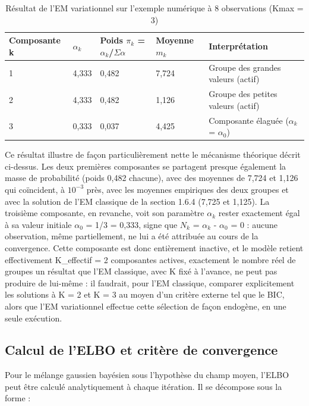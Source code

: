 \begin{table}[H]
\centering
\small
\setlength{\tabcolsep}{0.14cm}
\begin{tabular}{|p{2.77cm}|p{2.77cm}|p{2.77cm}|p{2.77cm}|p{2.77cm}|}
\hline
\textbf{Composante k} & \textbf{$\alpha _{k}$} & \textbf{Poids $\pi _{k}$ = $\alpha _{k}$/$\Sigma \alpha $} & \textbf{Moyenne $m_{k}$} & \textbf{Interprétation} \\
\hline
1 & 4,333 & 0,482 & 7,724 & Groupe des grandes valeurs (actif) \\
\hline
2 & 4,333 & 0,482 & 1,126 & Groupe des petites valeurs (actif) \\
\hline
3 & 0,333 & 0,037 & 4,425 & Composante élaguée ($\alpha _{k}$ = $\alpha _{0}$) \\
\hline
\end{tabular}
\caption{Résultat de l'EM variationnel sur l'exemple numérique à 8 observations (Kmax = 3)}
\label{tab:1_5}
\end{table}
Ce résultat illustre de façon particulièrement nette le mécanisme théorique décrit ci-dessus. Les deux premières composantes se partagent presque également la masse de probabilité (poids 0,482 chacune), avec des moyennes de 7,724 et 1,126 qui coïncident, à $10^{-3}$ près, avec les moyennes empiriques des deux groupes et avec la solution de l'EM classique de la section 1.6.4 (7,725 et 1,125). La troisième composante, en revanche, voit son paramètre $\alpha _{k}$ rester exactement égal à sa valeur initiale $\alpha _{0}$ = 1/3 = 0,333, signe que $N_{k}$ = $\alpha _{k}$ - $\alpha _{0}$ = 0 : aucune observation, même partiellement, ne lui a été attribuée au cours de la convergence. Cette composante est donc entièrement inactive, et le modèle retient effectivement K\_effectif = 2 composantes actives, exactement le nombre réel de groupes  un résultat que l'EM classique, avec K fixé à l'avance, ne peut pas produire de lui-même : il faudrait, pour l'EM classique, comparer explicitement les solutions à K = 2 et K = 3 au moyen d'un critère externe tel que le BIC, alors que l'EM variationnel effectue cette sélection de façon endogène, en une seule exécution.

\subsection{Calcul de l'ELBO et critère de convergence}
Pour le mélange gaussien bayésien sous l'hypothèse du champ moyen, l'ELBO peut être calculé analytiquement à chaque itération. Il se décompose sous la forme :

